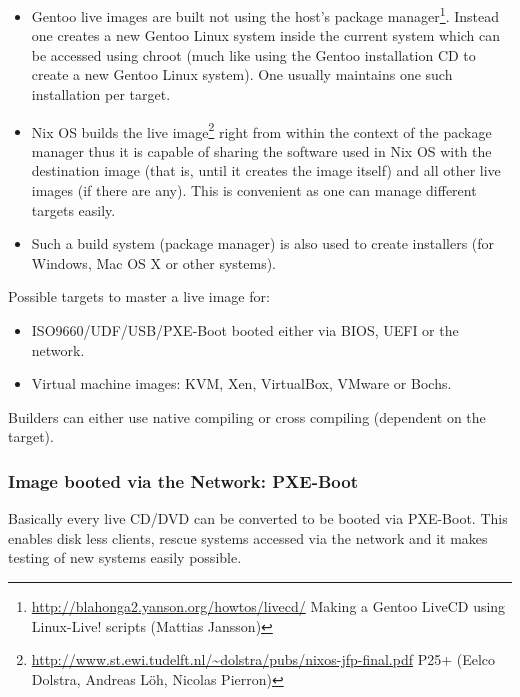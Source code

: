 \documentclass[a4paper,10pt]{article}
\begin{document}
\begin{itemize}
\item Gentoo live images are built not using the host's package manager\footnote{\url{http://blahonga2.yanson.org/howtos/livecd/} Making a Gentoo LiveCD using Linux-Live! scripts (Mattias Jansson)}. Instead one creates a new Gentoo Linux system inside the current system which can be accessed using chroot (much like using the Gentoo installation CD to create a new Gentoo Linux system). One usually maintains one such installation per target. 
\item Nix OS builds the live image\footnote{\url{http://www.st.ewi.tudelft.nl/~dolstra/pubs/nixos-jfp-final.pdf} P25+ (Eelco Dolstra, Andreas L\"oh, Nicolas Pierron)} right from within the context of the package manager thus it is capable of sharing the software used in Nix OS with the destination image (that is, until it creates the image itself) and all other live images (if there are any). This is convenient as one can manage different targets easily.
\item Such a build system (package manager) is also used to create installers (for Windows, Mac OS X or other systems).
\end{itemize}



Possible targets to master a live image for:
\begin{itemize}
\item ISO9660/UDF/USB/PXE-Boot booted either via BIOS, UEFI or the network.
\item Virtual machine images: KVM, Xen, VirtualBox, VMware or Bochs.
\end{itemize}
Builders can either use native compiling or cross compiling (dependent on the target).

\subsubsection{Image booted via the Network: PXE-Boot}
Basically every live CD/DVD can be converted to be booted via PXE-Boot. This enables disk less clients, rescue systems accessed via the network and it makes testing of new systems easily possible.
\end{document}
